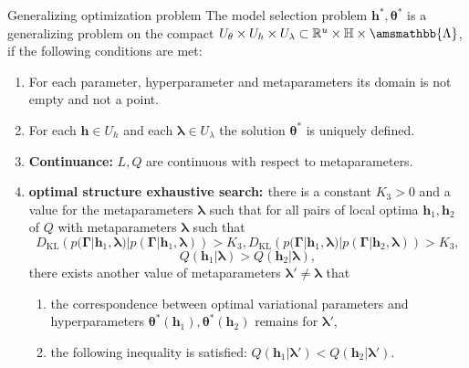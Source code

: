 \documentclass[usenames,dvipsnames,11pt,pdf,utf8,russian,aspectratio=43]{beamer}
\begin{document}
   
\begin{frame}{Generalizing optimization problem}
\footnotesize
The model selection problem  $\mathbf{h}^{*}, \boldsymbol{\theta}^{*}$ is a generalizing problem on the compact $U_{\theta}\times U_{h} \times U_{\lambda} \subset \mathbb{R}^{u} \times \mathbb{H} \times \amsmathbb{\Lambda}$, if the following conditions are met:
\begin{enumerate}
\item For each parameter, hyperparameter and metaparameters its domain is not empty and not a point.
\item For each  $\mathbf{h} \in U_h$ and each  $\boldsymbol{\lambda} \in U_{\lambda}$ the solution  $\boldsymbol{\theta}^{*}$ is uniquely defined.


\item \textbf{Continuance:} $L,Q$ are continuous with respect to metaparameters.
\item \textbf{\textcolor{OliveGreen}{optimal structure exhaustive search: }}
there is a constant $K_3>0$  and a value for the  metaparameters $\boldsymbol{\lambda}$ such that for all pairs of local optima $\mathbf{h}_1,\mathbf{h}_2$ of $Q$ with metaparameters $\boldsymbol{\lambda}$ such that  $$D_\text{KL}\left(p(\boldsymbol{\Gamma}| \mathbf{h}_1, \boldsymbol{\lambda}) | p(\boldsymbol{\Gamma}| \mathbf{h}_1, \boldsymbol{\lambda})\right) > K_3, D_\text{KL}\left(p(\boldsymbol{\Gamma}| \mathbf{h}_1, \boldsymbol{\lambda}) | p(\boldsymbol{\Gamma}| \mathbf{h}_2, \boldsymbol{\lambda})\right) > K_3,$$ $$Q(\mathbf{h}_1|\boldsymbol{\lambda})>Q(\mathbf{h}_2|\boldsymbol{\lambda}),$$  there exists another value of metaparameters $\boldsymbol{\lambda}' \neq \boldsymbol{\lambda}$ that
\begin{enumerate}
\item the  correspondence between optimal variational parameters and hyperparameters  $\boldsymbol{\theta}^{*}(\mathbf{h}_1),\boldsymbol{\theta}^{*}(\mathbf{h}_2)$ remains for $\boldsymbol{\lambda}'$,
\item the following inequality is satisfied: $Q(\mathbf{h}_1|\boldsymbol{\lambda}')<Q(\mathbf{h}_2|\boldsymbol{\lambda}')$.
\end{enumerate}



\end{enumerate}
\end{frame}
\end{document}
